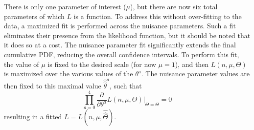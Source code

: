     There is only one parameter of interest ($\mu$), but there are now six total parameters of which $L$ is a function. %
    To address this without over-fitting to the data, a maximized fit is performed across the nuisance parameters.
    Such a fit eliminates their presence from the likelihood function, but it should be noted that it does so at a cost.
    The nuisance parameter fit significantly extends the final cumulative PDF, reducing the overall confidence intervals.
    To perform this fit, the value of $\mu$ is fixed to the desired scale (for now $\mu=1$),
        and then $L(n,\mu,\Theta)$ is maximized over the various values of the $\theta^a$.
    The nuisance parameter values are then fixed to this maximal value $\hat{\hat\theta}^a$, such that
    \begin{equation}
        \prod \limits_{a=0}^{4} \frac{\partial}{\partial \theta^a} L(n,\mu,\Theta) |_{\Theta=\hat{\hat\Theta}} = 0
    \end{equation}
    resulting in a fitted $L = L(n,\mu,\hat{\hat\Theta})$.
        
